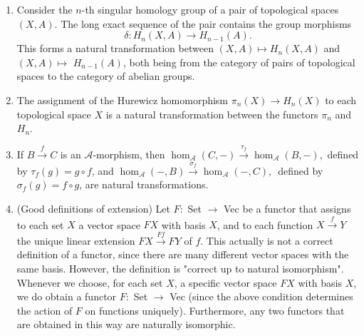 \begin{example}
    \begin{enumerate}
        \item     Consider the $n$-th singular homology group of a pair of topological spaces $(X, A)$. The long exact sequence of the pair contains the group morphisms
        $$
        \delta: H_n(X, A) \rightarrow H_{n-1}(A) .
        $$
        \noindent
        This forms a natural transformation between $(X, A) \mapsto H_n(X, A)$ and $(X, A) \mapsto$ $H_{n-1}(A)$, both being from the category of pairs of topological spaces to the category of abelian groups.
        \item The assignment of the Hurewicz homomorphism $\pi_n(X) \rightarrow H_n(X)$ to each topological space $X$ is a natural transformation between the functors $\pi_n$ and $H_n$.
        \item If $B \xrightarrow{f} C$ is an $\mathcal{A}$-morphism, then
        $
        \operatorname{hom}_{\mathcal{A}}(C,-) \xrightarrow{\tau_f} \operatorname{hom}_{\mathcal{A}}(B,-),
        $
        defined by $\tau_f(g)=g \circ f$, and
        $
        \operatorname{hom}_{\mathcal{A}}(-, B) \xrightarrow{\sigma_f} \operatorname{hom}_{\mathcal{A}}(-, C) \text {, }
        $
        defined by $\sigma_f(g)=f \circ g$, are natural transformations.
        \item (Good definitions of extension) Let $F:$ Set $\rightarrow$ Vec be a functor that assigns to each set $X$ a vector space $F X$ with basis $X$, and to each function $X \xrightarrow{f} Y$ the unique linear extension $F X \xrightarrow{F f} F Y$ of $f$. This actually is not a correct definition of a functor, since there are many different vector spaces with the same basis. However, the definition is "correct up to natural isomorphism". Whenever we choose, for each set $X$, a specific vector space $F X$ with basis $X$, we do obtain a functor $F:$ Set $\rightarrow$ Vec (since the above condition determines the action of $F$ on functions uniquely). Furthermore, any two functors that are obtained in this way are naturally isomorphic.

\end{enumerate}
\end{example}
